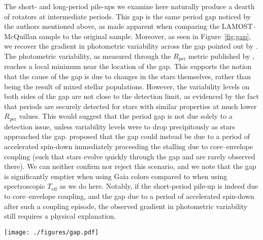 \documentclass[trackchanges,twocolumn]{aastex631}
\newcommand{\lamostmcq}{LAMOST--McQuillan\xspace}
\newcommand{\teff}{\ensuremath{T_{\mathrm{eff}}}\xspace}
\newcommand{\prot}{\ensuremath{P_\mathrm{rot}}\xspace}
\newcommand{\rper}{\ensuremath{R_\mathrm{per}}\xspace}
\begin{document}
The short- and long-period pile-ups we examine here naturally produce a dearth of rotators at intermediate periods. This gap is the same period gap noticed by the authors mentioned above, as made apparent when comparing the \lamostmcq sample to the original \citet{McQuillan2014} sample. Moreover, as seen in Figure~\ref{fig:gap}, we recover the gradient in photometric variability across the gap pointed out by \citet{Reinhold2019}. The photometric variability, as measured through the \rper metric published by \citet{McQuillan2014}, reaches a local minimum near the location of the gap. This supports the notion that the cause of the gap is due to changes in the stars themselves, rather than being the result of mixed stellar populations. However, the variability levels on both sides of the gap are not close to the detection limit, as evidenced by the fact that periods are securely detected for stars with similar properties at much lower \rper values. This would suggest that the period gap is not due solely to a detection issue, unless variability levels were to drop precipitously as stars approached the gap. \citet{Gordon2021} proposed that the gap could instead be due to a period of accelerated spin-down immediately proceeding the stalling due to core–envelope coupling (such that stars evolve quickly through the gap and are rarely observed there). We can neither confirm nor reject this scenario, and we note that the gap is significantly emptier when using Gaia colors \citep{DavenportCovey2018, Gordon2021} compared to when using spectroscopic \teff as we do here. Notably, if the short-period pile-up is indeed due to core–envelope coupling, and the gap due to a period of accelerated spin-down after such a coupling episode, the observed gradient in photometric variability still requires a physical explanation.

\begin{figure*}
    \centering
    \texttt{[image: ./figures/gap.pdf]}
    \caption{The \teff--\prot distribution of the \lamostmcq (left) and \citet{McQuillan2014} samples color coded by the variability amplitude, \rper. Black contours show Gaussian kernel density estimation of the plotted distributions, and the dashed line shows a constant Rossby curve of Ro~=~0.5.
    The long- and short-period pile-ups are separated by a relative dearth of stars with intermediate rotation periods. A strong gradient in \rper is apparent across this gap, such that variability amplitude reaches a local minimum near the gap's center.}
    \label{fig:gap}
\end{figure*}
\end{document}
